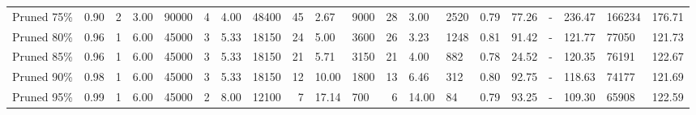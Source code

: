 \begin{table*}
{\begin{tabular}{llrllrllrllrllrlllll}
 Pruned 75\% &     0.90 &               2 &       3.00 &   90000 &                 4 &       4.00 &   48400 &                45 &       2.67 &    9000 &           28 &       3.00 &    2520 & 0.79 & 77.26 &      - &  236.47 &  166234 &    176.71 \\
 Pruned 80\% &     0.96 &               1 &       6.00 &   45000 &                 3 &       5.33 &   18150 &                24 &       5.00 &    3600 &           26 &       3.23 &    1248 & 0.81 & 91.42 &      - &  121.77 &   77050 &    121.73 \\
 Pruned 85\% &     0.96 &               1 &       6.00 &   45000 &                 3 &       5.33 &   18150 &                21 &       5.71 &    3150 &           21 &       4.00 &     882 & 0.78 & 24.52 &      - &  120.35 &   76191 &    122.67 \\
 Pruned 90\% &     0.98 &               1 &       6.00 &   45000 &                 3 &       5.33 &   18150 &                12 &      10.00 &    1800 &           13 &       6.46 &     312 & 0.80 & 92.75 &      - &  118.63 &   74177 &    121.69 \\
 Pruned 95\% &     0.99 &               1 &       6.00 &   45000 &                 2 &       8.00 &   12100 &                 7 &      17.14 &     700 &            6 &      14.00 &      84 & 0.79 & 93.25 &      - &  109.30 &   65908 &    122.59 \\
\bottomrule
\end{tabular}}
\end{table*}

